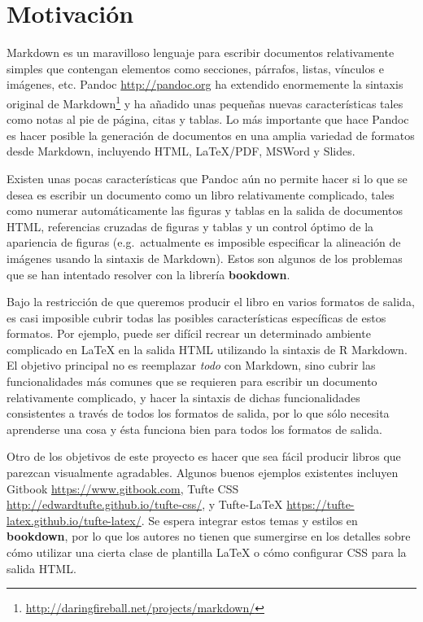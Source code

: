 \documentclass[12pt,]{krantz}
\renewcommand{\href}[2]{#2\footnote{\url{#1}}}
\theoremstyle{definition}
\theoremstyle{definition}
\theoremstyle{remark}
\begin{document}
\section{Motivación}\label{motivacion}

Markdown es un maravilloso lenguaje para escribir documentos
relativamente simples que contengan elementos como secciones, párrafos,
listas, vínculos e imágenes, etc. Pandoc \url{http://pandoc.org} ha
extendido enormemente la
\href{http://daringfireball.net/projects/markdown/}{sintaxis original de
Markdown} y ha añadido unas pequeñas nuevas características tales como
notas al pie de página, citas y tablas. Lo más importante que hace
Pandoc es hacer posible la generación de documentos en una amplia
variedad de formatos desde Markdown, incluyendo HTML, LaTeX/PDF, MSWord
y Slides.

Existen unas pocas características que Pandoc aún no permite hacer si lo
que se desea es escribir un documento como un libro relativamente
complicado, tales como numerar automáticamente las figuras y tablas en
la salida de documentos HTML, referencias cruzadas de figuras y tablas y
un control óptimo de la apariencia de figuras (e.g.~actualmente es
imposible especificar la alineación de imágenes usando la sintaxis de
Markdown). Estos son algunos de los problemas que se han intentado
resolver con la librería \textbf{bookdown}.

Bajo la restricción de que queremos producir el libro en varios formatos
de salida, es casi imposible cubrir todas las posibles características
específicas de estos formatos. Por ejemplo, puede ser difícil recrear un
determinado ambiente complicado en LaTeX en la salida HTML utilizando la
sintaxis de R Markdown. El objetivo principal no es reemplazar
\emph{todo} con Markdown, sino cubrir las funcionalidades más comunes
que se requieren para escribir un documento relativamente complicado, y
hacer la sintaxis de dichas funcionalidades consistentes a través de
todos los formatos de salida, por lo que sólo necesita aprenderse una
cosa y ésta funciona bien para todos los formatos de
salida.

Otro de los objetivos de este proyecto es hacer que sea fácil producir
libros que parezcan visualmente agradables. Algunos buenos ejemplos
existentes incluyen Gitbook \url{https://www.gitbook.com}, Tufte CSS
\url{http://edwardtufte.github.io/tufte-css/}, y Tufte-LaTeX
\url{https://tufte-latex.github.io/tufte-latex/}. Se espera integrar
estos temas y estilos en \textbf{bookdown}, por lo que los autores no
tienen que sumergirse en los detalles sobre cómo utilizar una cierta
clase de plantilla LaTeX o cómo configurar CSS para la salida HTML.
\end{document}
